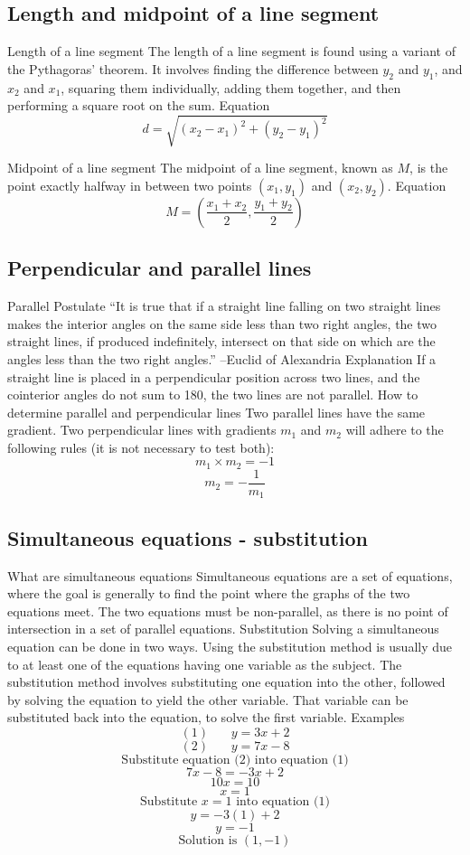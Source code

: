 \begin{outline}
\0
\subsection{Length and midpoint of a line segment}
	\1 Length of a line segment
		\2 The length of a line segment is found using a variant of the Pythagoras' theorem. It involves finding the difference between $y_2$ and $y_1$, and $x_2$ and $x_1$, squaring them individually, adding them together, and then performing a square root on the sum.
			\3 Equation
				\[d = \sqrt{(x_2 - x_1)^2 + (y_2 - y_1)^2}\]
				
	\1 Midpoint of a line segment
		\2 The midpoint of a line segment, known as $M$, is the point exactly halfway in between two points $(x_1, y_1)$ and $(x_2, y_2)$.
			\3 Equation
				\[M = \left(\frac{x_1 + x_2}{2}, \frac{y_1 + y_2}{2}\right)\]

\0
\subsection{Perpendicular and parallel lines}
	\1 Parallel Postulate
		\2 ``It is true that if a straight line falling on two straight lines makes the interior angles on the same side less than two right angles, the two straight lines, if produced indefinitely, intersect on that side on which are the angles less than the two right angles.'' --Euclid of Alexandria
	\1 Explanation
		\2 If a straight line is placed in a perpendicular position across two lines, and the cointerior angles do not sum to 180\degree, the two lines are not parallel.
	\1 How to determine parallel and perpendicular lines
		\2 Two parallel lines have the same gradient. Two perpendicular lines with gradients $m_1$ and $m_2$ will adhere to the following rules (it is not necessary to test both):
			\[m_1 \times m_2 = -1\]
			\[m_2 = -\frac{1}{m_1}\]

\0
\subsection{Simultaneous equations - substitution}
	\1 What are simultaneous equations
		\2 Simultaneous equations are a set of equations, where the goal is generally to find the point where the graphs of the two equations meet. The two equations must be non-parallel, as there is no point of intersection in a set of parallel equations.
	\1 Substitution
		\2 Solving a simultaneous equation can be done in two ways. Using the substitution method is usually due to at least one of the equations having one variable as the subject. The substitution method involves substituting one equation into the other, followed by solving the equation to yield the other variable. That variable can be substituted back into the equation, to solve the first variable.
			\3 Examples
				\[(1)\ \ \ \ \ \ \ \ y = 3x + 2\]
				\[(2)\ \ \ \ \ \ \ \ y = 7x - 8\]
				\[\text{Substitute equation (2) into equation (1)}\]
				\[7x - 8 = -3x + 2\]
				\[10x = 10\]
				\[x = 1\]
				\[\text{Substitute $x = 1$ into equation (1)}\]
				\[y = -3(1) + 2\]
				\[y = -1\]
				\[\text{Solution is }(1, -1)\]
				

\end{outline}
